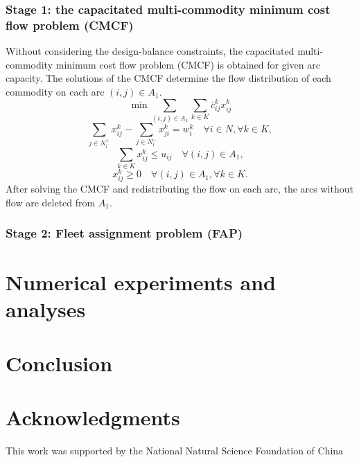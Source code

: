 \documentclass[11pt,nonblindrev,fleqn]{article}
\begin{document}
\subsubsection{Stage 1: the capacitated multi-commodity minimum cost flow problem (CMCF)}
Without considering the design-balance constraints, the capacitated multi-commodity minimum cost flow problem (CMCF) is obtained for given arc capacity. The solutions of the CMCF  determine the flow distribution of each commodity on each arc $(i,j)\in A_1$.
\begin{equation}\label{CMCF_obj}
  \min \sum_{(i,j)\in A_1}\sum_{k\in K} \bar{c}_{ij}^k x_{ij}^k
\end{equation}
\begin{equation}\label{CMCF_demand}
  \sum_{j\in N_i^+}x_{ij}^k - \sum_{j\in N_i^-}x_{ji}^k = w_i^k  \quad  \forall i\in N, \forall k\in K,
\end{equation}
\begin{equation}\label{CMCF_capacity}
  \sum_{k\in K} x_{ij}^k \leq u_{ij}  \quad  \forall (i,j)\in A_1,
\end{equation}
\begin{equation}\label{CMCF_x}
  x_{ij}^k \geq 0  \quad  \forall (i,j)\in A_1, \forall k\in K.
\end{equation}
After solving the CMCF and redistributing the flow on each arc, the arcs without flow are deleted from $A_1$.
\subsubsection{Stage 2: Fleet assignment problem (FAP)}



\section{Numerical experiments and analyses}


\section{Conclusion}

\section*{Acknowledgments}

This work was supported by the National Natural Science Foundation of China
\end{document}
